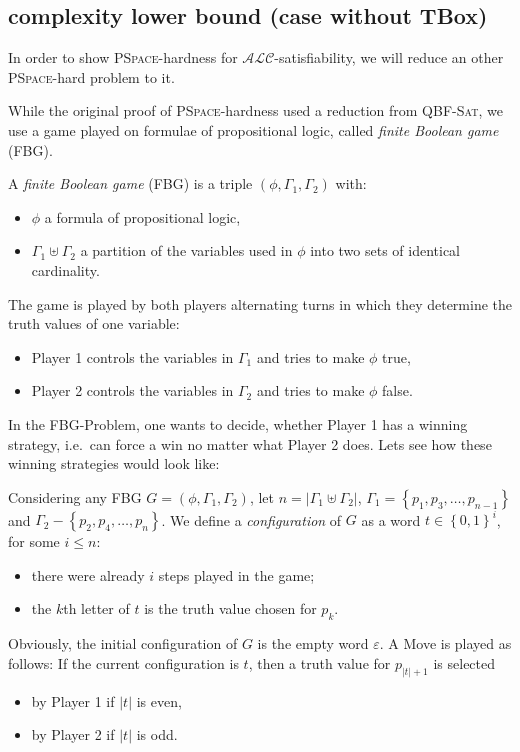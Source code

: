 \subsection{complexity lower bound (case without TBox)}
In order to show  \textsc{PSpace}-hardness for $\mathcal{ALC}$-satisfiability,
we will reduce an other \textsc{PSpace}-hard problem to it.

While the original proof of \textsc{PSpace}-hardness used a reduction from \textsc{QBF-Sat},
we use a game played on formulae of propositional logic, called \textit{finite Boolean game} (FBG).

\begin{definition*}[FBG]
	A \textit{finite Boolean game} (FBG) is a triple $(\phi, \Gamma_1, \Gamma_2)$ with:
	\begin{itemize}
		\item $\phi$ a formula of propositional logic,
		\item $\Gamma_1 \uplus \Gamma_2$ a partition of the variables used in $\phi$ into two sets of identical cardinality.
	\end{itemize}
	The game is played by both players alternating turns in which they determine the truth values of one variable:
	\begin{itemize}
		\item Player 1 controls the variables in $\Gamma_1$ and tries to make $\phi$ true,
		\item Player 2 controls the variables in $\Gamma_2$ and tries to make $\phi$ false.
	\end{itemize}
\end{definition*}

In the FBG-Problem, one wants to decide, whether Player 1 has a winning strategy,
i.e.\ can force a win no matter what Player 2 does.
Lets see how these winning strategies would look like:

Considering any FBG $G = (\phi, \Gamma_1, \Gamma_2)$, let $n = \lvert \Gamma_1 \uplus \Gamma_2 \rvert$,
$\Gamma_1 = \left\{ p_1, p_3, \ldots, p_{n-1} \right\}$ and $\Gamma_2 - \left\{ p_2, p_4, \ldots, p_n \right\}$.
We define a \textit{configuration} of $G$ as a word $t \in \left\{ 0,1 \right\}^i$, for some $i \leq n$:
\begin{itemize}
	\item there were already $i$ steps played in the game;
	\item the $k$th letter of $t$ is the truth value chosen for $p_k$.
\end{itemize}
Obviously, the initial configuration of $G$ is the empty word $\varepsilon$.
A Move is played as follows:
If the current configuration is  $t$, then a truth value for $p_{\lvert t \rvert + 1}$ is selected
\begin{itemize}
	\item by Player 1 if $\lvert t \rvert$ is even,
	\item by Player 2 if $\lvert t \rvert$ is odd.
\end{itemize}
